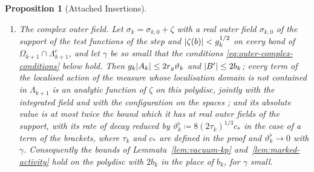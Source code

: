 \documentclass[11pt]{preprint}
\DeclarePairedDelimiter{\abs}{\lvert}{\rvert}
\numberwithin{equation}{section}
\newtheorem{proposition}{Proposition}
\theoremstyle{definition}
\theoremstyle{remark}
\theoremstyle{plain}
\begin{document}
\begin{proposition}[Attached Insertions]
\begin{enumerate}[label=(\roman*)]
\item \emph{The complex outer field.} Let $\sigma_k = \sigma_{k,0} + \zeta$ with a real outer field $\sigma_{k,0}$ of the support of the test functions of the step and $\abs{\zeta(b)} < g_k^{1/2}$ on every bond of $\Omega_{k+1} \cap \Lambda_{k+1}^c$, and let $\gamma$ be so small that the conditions \eqref{eq:outer-complex-conditions} below hold. Then $g_k\abs{A_k} \leq 2r_y\vartheta_k$ and $\abs{B'} \leq 2b_k$; every term of the localised action of the measure \cite[(3.27)]{BalabanCRE} whose localisation domain is not contained in $\Lambda_{k+1}$ is an analytic function of $\zeta$ on this polydisc, jointly with the integrated field and with the configuration on the spaces \cite[(3.43), p.~276]{BalabanCRE}; and its absolute value is at most twice the bound which it has at real outer fields of the support, with its rate of decay reduced by $\vartheta^\flat_k \coloneqq 8(2\tau_k)^{1/3}c_*$ in the case of a term of the brackets, where $\tau_k$ and $c_*$ are defined in the proof and $\vartheta^\flat_k \to 0$ with $\gamma$. Consequently the bounds of Lemmata~\ref{lem:vacuum-kp} and~\ref{lem:marked-activity} hold on the polydisc with $2b_k$ in the place of $b_k$, for $\gamma$ small.
\end{enumerate}
\end{proposition}
\end{document}
